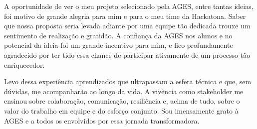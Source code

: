 A oportunidade de ver o meu projeto selecionado pela AGES, entre tantas ideias, foi motivo de grande alegria para mim e para o meu time da Hackatona. Saber que nossa proposta seria levada adiante por uma equipe tão dedicada trouxe um sentimento de realização e gratidão. A confiança da AGES nos alunos e no potencial da ideia foi um grande incentivo para mim, e fico profundamente agradecido por ter tido essa chance de participar ativamente de um processo tão enriquecedor.\par

Levo dessa experiência aprendizados que ultrapassam a esfera técnica e que, sem dúvidas, me acompanharão ao longo da vida. A vivência como stakeholder me ensinou sobre colaboração, comunicação, resiliência e, acima de tudo, sobre o valor do trabalho em equipe e do esforço conjunto. Sou imensamente grato à AGES e a todos os envolvidos por essa jornada transformadora.\par


